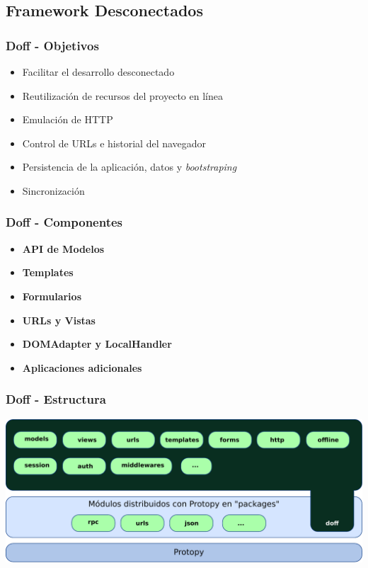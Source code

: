 \documentclass{beamer}
\begin{document}
\subsection{Framework Desconectados}
\begin{frame}
    \frametitle{Doff - Objetivos}
    \begin{itemize}
        \item{Facilitar el desarrollo desconectado}
        \item{Reutilización de recursos del proyecto en línea}
        \item{Emulación de HTTP}
        \item{Control de URLs e historial del navegador}
        \item{Persistencia de la aplicación, datos y {\it bootstraping}}
        \item{Sincronización}
        \end{itemize}
\end{frame}

\begin{frame}
    \frametitle{Doff - Componentes}
    \begin{itemize}
        \item {\bf API de Modelos }
        \item {\bf Templates }
        \item {\bf Formularios }
        \item {\bf URLs y Vistas }
        \item {\bf DOMAdapter y LocalHandler }
        \item {\bf Aplicaciones adicionales }
    \end{itemize}
\end{frame}

\begin{frame}
    \frametitle{Doff - Estructura}
    \includegraphics[scale=0.5]{esquema_doff.pdf}
\end{frame}
\end{document}
